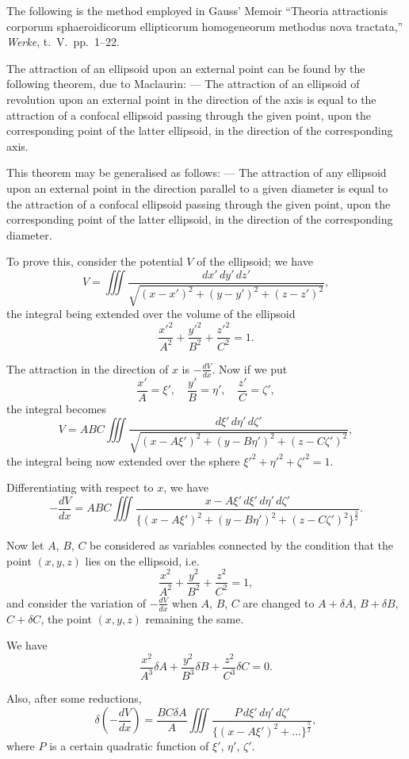 \documentclass[12pt,a4paper]{article}
\theoremstyle{plain}
\begin{document}
The following is the method employed in Gauss' Memoir ``Theoria attractionis corporum sphaeroidicorum ellipticorum homogeneorum methodus nova tractata,'' \textit{Werke}, t.~V.\ pp.~1--22.

The attraction of an ellipsoid upon an external point can be found by the following theorem, due to Maclaurin: --- The attraction of an ellipsoid of revolution upon an external point in the direction of the axis is equal to the attraction of a confocal ellipsoid passing through the given point, upon the corresponding point of the latter ellipsoid, in the direction of the corresponding axis.

This theorem may be generalised as follows: --- The attraction of any ellipsoid upon an external point in the direction parallel to a given diameter is equal to the attraction of a confocal ellipsoid passing through the given point, upon the corresponding point of the latter ellipsoid, in the direction of the corresponding diameter.

To prove this, consider the potential $V$ of the ellipsoid; we have
\[
V = \iiint \frac{dx'\, dy'\, dz'}{\sqrt{(x-x')^2 + (y-y')^2 + (z-z')^2}},
\]
the integral being extended over the volume of the ellipsoid
\[
\frac{x'^2}{A^2} + \frac{y'^2}{B^2} + \frac{z'^2}{C^2} = 1.
\]

The attraction in the direction of $x$ is $-\frac{dV}{dx}$. Now if we put
\[
\frac{x'}{A} = \xi', \quad \frac{y'}{B} = \eta', \quad \frac{z'}{C} = \zeta',
\]
the integral becomes
\[
V = ABC \iiint \frac{d\xi'\, d\eta'\, d\zeta'}{\sqrt{(x-A\xi')^2 + (y-B\eta')^2 + (z-C\zeta')^2}},
\]
the integral being now extended over the sphere $\xi'^2 + \eta'^2 + \zeta'^2 = 1$.

Differentiating with respect to $x$, we have
\[
-\frac{dV}{dx} = ABC \iiint \frac{x-A\xi'\, d\xi'\, d\eta'\, d\zeta'}{\{(x-A\xi')^2 + (y-B\eta')^2 + (z-C\zeta')^2\}^{\frac{3}{2}}}.
\]

Now let $A$, $B$, $C$ be considered as variables connected by the condition that the point $(x,y,z)$ lies on the ellipsoid, i.e.
\[
\frac{x^2}{A^2} + \frac{y^2}{B^2} + \frac{z^2}{C^2} = 1,
\]
and consider the variation of $-\frac{dV}{dx}$ when $A$, $B$, $C$ are changed to $A+\delta A$, $B+\delta B$, $C+\delta C$, the point $(x,y,z)$ remaining the same.

We have
\[
\frac{x^2}{A^3}\delta A + \frac{y^2}{B^3}\delta B + \frac{z^2}{C^3}\delta C = 0.
\]

Also, after some reductions,
\[
\delta\left(-\frac{dV}{dx}\right) = \frac{BC\delta A}{A} \iiint \frac{P\, d\xi'\, d\eta'\, d\zeta'}{\{(x-A\xi')^2 + \ldots\}^{\frac{5}{2}}},
\]
where $P$ is a certain quadratic function of $\xi'$, $\eta'$, $\zeta'$.
\end{document}
